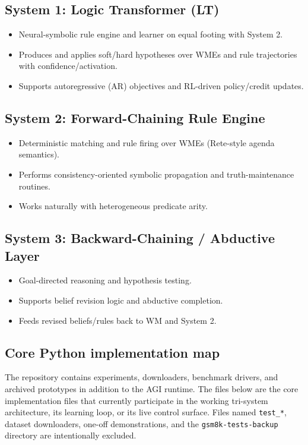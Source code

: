 \documentclass[14pt]{article}
\begin{document}
\subsection{System 1: Logic Transformer (LT)}
\begin{itemize}[leftmargin=1.5em]
  \item Neural-symbolic rule engine and learner on equal footing with System 2.
  \item Produces and applies soft/hard hypotheses over WMEs and rule trajectories with confidence/activation.
  \item Supports autoregressive (AR) objectives and RL-driven policy/credit updates.
\end{itemize}

\subsection{System 2: Forward-Chaining Rule Engine}
\begin{itemize}[leftmargin=1.5em]
  \item Deterministic matching and rule firing over WMEs (Rete-style agenda semantics).
  \item Performs consistency-oriented symbolic propagation and truth-maintenance routines.
  \item Works naturally with heterogeneous predicate arity.
\end{itemize}

\subsection{System 3: Backward-Chaining / Abductive Layer}
\begin{itemize}[leftmargin=1.5em]
  \item Goal-directed reasoning and hypothesis testing.
  \item Supports belief revision logic and abductive completion.
  \item Feeds revised beliefs/rules back to WM and System 2.
\end{itemize}

\subsection{Core Python implementation map}
The repository contains experiments, downloaders, benchmark drivers, and archived
prototypes in addition to the AGI runtime.  The files below are the core
implementation files that currently participate in the working tri-system
architecture, its learning loop, or its live control surface.  Files named
\texttt{test\_*}, dataset downloaders, one-off demonstrations, and the
\texttt{gsm8k-tests-backup} directory are intentionally excluded.
\end{document}
